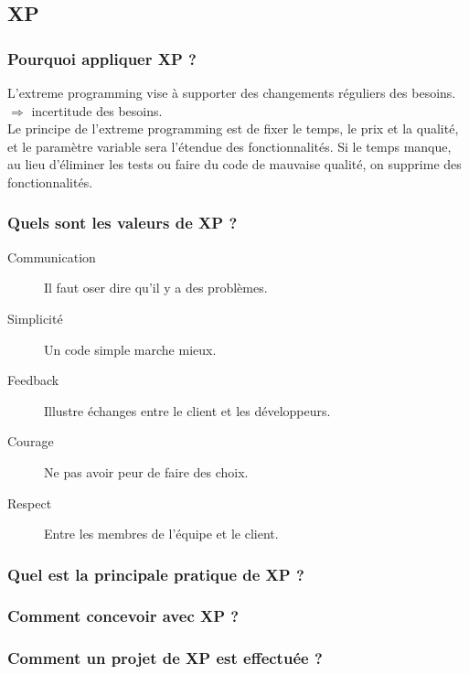 \subsection{XP}


\subsubsection{Pourquoi appliquer XP ?}
L’extreme programming vise à supporter des changements réguliers des besoins.\\
$\Rightarrow$ incertitude des besoins.\\
Le principe de l’extreme programming est de fixer le temps, le prix et la qualité, et le paramètre variable sera l’étendue des fonctionnalités. Si le temps manque, au lieu d’éliminer les tests ou faire du code de mauvaise qualité, on supprime des fonctionnalités.


\subsubsection{Quels sont les valeurs de XP ?}
\begin{description}
	\item [Communication] Il faut oser dire qu’il y a des problèmes.
	\item [Simplicité] Un code simple marche mieux.
	\item [Feedback] Illustre échanges entre le client et les développeurs.
	\item [Courage] Ne pas avoir peur de faire des choix.
	\item [Respect] Entre les membres de l’équipe et le client.
\end{description}


\subsubsection{Quel est la principale pratique de XP ?}


\subsubsection{Comment concevoir avec XP ?}


\subsubsection{Comment un projet de XP est effectuée ?}
